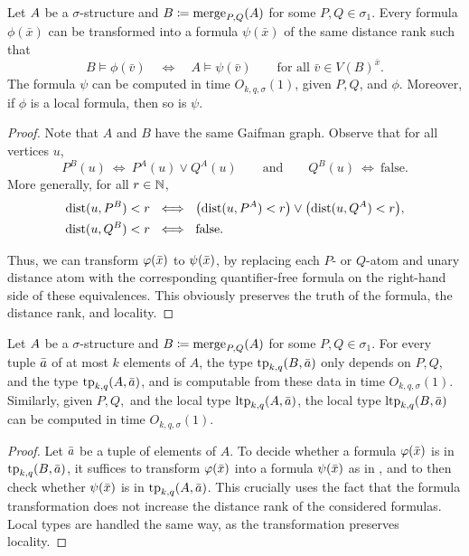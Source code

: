 \begin{lemma}\label{lem:merge-interp}
    Let ${{A}}$ be a $\sigma$-structure and \({{B}} \coloneqq \mathrm{merge}_{P,Q}({{A}})\)
    for some $P,Q\in\sigma_1$.
    Every \distFO formula \(\phi(\bar x)\) can be transformed into a \distFO formula \(\psi(\bar x)\) of the same distance rank
    such that
    \[B \models \phi(\bar v)\quad\iff\quad A \models \psi(\bar v)\qquad \text{for all }\bar v\in V(B)^{\bar x}.\]
    The formula $\psi$ can be computed in time $O_{k,q,\sigma}(1)$,
    given $P, Q$, and $\phi$. Moreover, if $\phi$ is a local \distFO formula, then so is $\psi$.
\end{lemma}
\begin{proof}
    Note that \(A\) and \(B\) have the same Gaifman graph.
    Observe that for all vertices \(u\),
    \[
        P^B(u) ~\iff~ P^A(u) \lor Q^A(u) \quad\quad\text{and}\quad\quad Q^B(u) ~\iff~ \text{false}.
    \]
    More generally, for all $r\in\mathbb N$,
    \begin{align*}
        \mathrm{dist}(u, P^B)< r ~&\iff~
        \bigl(\mathrm{dist}(u, P^A)< r\bigr) \lor
        \bigl(\mathrm{dist}(u, Q^A)< r\bigr),
    \\ \mathrm{dist}(u, Q^B)< r~&\iff~ \text{false}.
    \end{align*}

    Thus, we can transform \(\varphi(\bar x)\) to \(\psi(\bar x)\), by replacing each \(P\)- or \(Q\)-atom and unary distance atom with the corresponding quantifier-free formula on the right-hand side of these equivalences.
    This obviously preserves  the truth of the formula, the distance rank, and locality.
\end{proof}
\begin{corollary}\label{cor:merge-interp}
     Let ${{A}}$ be a $\sigma$-structure and \({{B}} \coloneqq \mathrm{merge}_{P,Q}({{A}})\)
    for some $P,Q\in\sigma_1$.
    For every tuple $\bar a$ of at most $k$ elements of $A$,
    the type $\textnormal{tp}_{k,q}(B,\bar a)$
    only depends on $P,Q$, and the type
    $\textnormal{tp}_{k,q}(A,\bar a)$,
    and is computable from these data in time $O_{k,q,\sigma}(1)$.
Similarly, given $P,Q,$ and the local type $\textnormal{ltp}_{k,q}(A,\bar a)$,
the local type $\textnormal{ltp}_{k,q}(B,\bar a)$ can be computed in time $O_{k,q,\sigma}(1)$.
\end{corollary}
\begin{proof}
    Let \(\bar a\) be a tuple of elements of $A$.
    To decide whether a formula $\varphi(\bar x)$ is in $\textnormal{tp}_{k,q}(B,\bar a)$,
    it suffices to  transform $\varphi(\bar x)$ into a formula $\psi(\bar x)$ as in ,
    and to then check whether $\psi(\bar x)$ is in $\textnormal{tp}_{k,q}(A,\bar a)$.
    This crucially uses the fact that the formula transformation does not increase the distance rank of the considered formulas. Local types are handled the same way, as the transformation preserves locality.
\end{proof}

